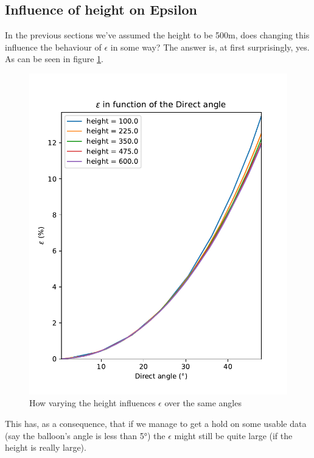 \documentclass[11pt,a4paper,faculty=we,language=en,doctype=report]{cls/ugent-doc}
\begin{document}
\subsection{Influence of height on Epsilon}
In the previous sections we've assumed the height to be 500m, does changing this influence the behaviour of $\epsilon$ in some way?
The answer is, at first surprisingly, yes. As can be seen in figure \ref{fig:EpsWithHeight}.
\begin{figure}
	\centering
	\includegraphics[height=0.5\textheight]{figures/EpsilonWithHeight.pdf}
	\caption{How varying the height influences $\epsilon$ over the same angles}
	\label{fig:EpsWithHeight}
\end{figure}
This has, as a consequence, that if we manage to get a hold on some
usable data (say the balloon's angle is less than 5°) the $\epsilon$
might still be quite large (if the height is really large).
\newpage
\end{document}
